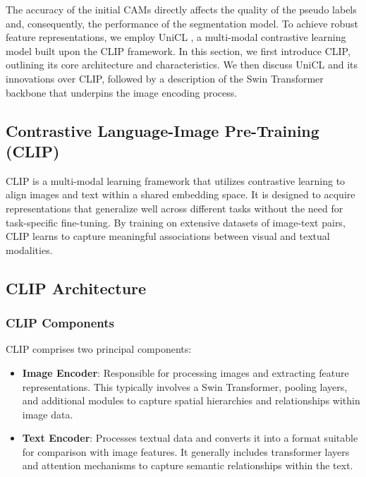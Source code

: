 The accuracy of the initial CAMs directly affects the quality of the pseudo labels and, consequently, the performance of the segmentation model. To achieve robust feature representations, we employ UniCL \cite{vl_unicl}, a multi-modal contrastive learning model built upon the CLIP framework. In this section, we first introduce CLIP, outlining its core architecture and characteristics. We then discuss UniCL and its innovations over CLIP, followed by a description of the Swin Transformer backbone that underpins the image encoding process.

\subsection{Contrastive Language-Image Pre-Training (CLIP)}
\label{subsec:clip}

CLIP \cite{vl_clip} is a multi-modal learning framework that utilizes contrastive learning to align images and text within a shared embedding space. It is designed to acquire representations that generalize well across different tasks without the need for task-specific fine-tuning. By training on extensive datasets of image-text pairs, CLIP learns to capture meaningful associations between visual and textual modalities.

\subsection{CLIP Architecture}
\label{subsec:clip_architecture}

\subsubsection{CLIP Components}
CLIP comprises two principal components:

\begin{itemize}
    \item \textbf{Image Encoder}: Responsible for processing images and extracting feature representations. This typically involves a Swin Transformer, pooling layers, and additional modules to capture spatial hierarchies and relationships within image data.
    \item \textbf{Text Encoder}: Processes textual data and converts it into a format suitable for comparison with image features. It generally includes transformer layers and attention mechanisms to capture semantic relationships within the text.
\end{itemize}

